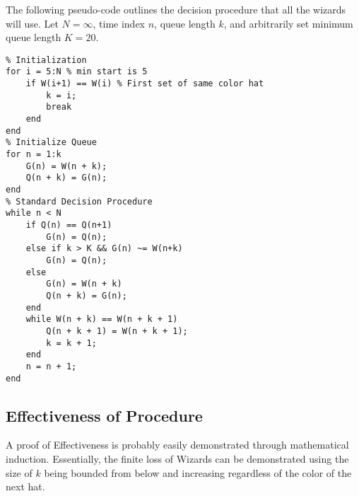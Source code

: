 \documentclass[]{article}
\begin{document}
\newpage
The following pseudo-code outlines the decision procedure that all the wizards will use. 
Let $N=\infty$, time index $n$, queue length $k$, and arbitrarily set minimum queue length $K = 20$.
\begin{lstlisting}
% Initialization
for i = 5:N % min start is 5
    if W(i+1) == W(i) % First set of same color hat
        k = i;
        break
    end
end
% Initialize Queue
for n = 1:k
    G(n) = W(n + k);
    Q(n + k) = G(n);
end
% Standard Decision Procedure
while n < N
    if Q(n) == Q(n+1)
        G(n) = Q(n);
    else if k > K && G(n) ~= W(n+k)
        G(n) = Q(n);
    else
        G(n) = W(n + k)
        Q(n + k) = G(n);
    end
    while W(n + k) == W(n + k + 1)
        Q(n + k + 1) = W(n + k + 1);
        k = k + 1;
    end
    n = n + 1;
end
\end{lstlisting}


\subsection*{Effectiveness of Procedure}
A proof of Effectiveness is probably easily demonstrated through mathematical induction. 
Essentially, the finite loss of Wizards can be demonstrated using the size of $k$ 
being bounded from below and increasing regardless of the color of the next hat.
\end{document}
